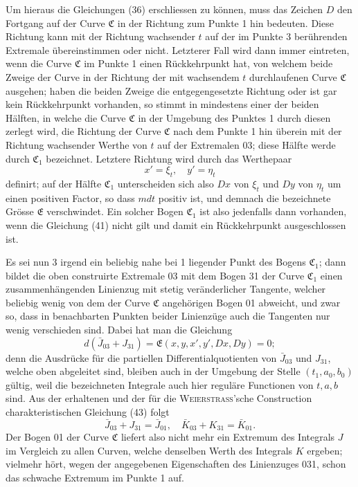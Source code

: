 \documentclass[11pt,a4paper,leqno]{article}
\begin{document}
Um hieraus die Gleichungen (36) erschliessen zu können, muss das Zeichen $D$ den Fortgang auf der Curve $\mathfrak{C}$ in der Richtung zum Punkte 1 hin bedeuten. Diese Richtung kann mit der Richtung wachsender $t$ auf der im Punkte 3 berührenden Extremale übereinstimmen oder nicht. Letzterer Fall wird dann immer eintreten, wenn die Curve $\mathfrak{C}$ im Punkte 1 einen Rückkehrpunkt hat, von welchem beide Zweige der Curve in der Richtung der mit wachsendem $t$ durchlaufenen Curve $\mathfrak{C}$ ausgehen; haben die beiden Zweige die entgegengesetzte Richtung oder ist gar kein Rückkehrpunkt vorhanden, so stimmt in mindestens einer der beiden Hälften, in welche die Curve $\mathfrak{C}$ in der Umgebung des Punktes 1 durch diesen zerlegt wird, die Richtung der Curve $\mathfrak{C}$ nach dem Punkte 1 hin überein mit der Richtung wachsender Werthe von $t$ auf der Extremalen 03; diese Hälfte werde durch $\mathfrak{C}_1$ bezeichnet. Letztere Richtung wird durch das Werthepaar
\[
x'=\xi_t,
\quad y'=\eta_t
\]
definirt; auf der Hälfte $\mathfrak{C}_1$ unterscheiden sich also $Dx$ von $\xi_t$ und $Dy$ von $\eta_t$ um einen positiven Factor, so dass $mdt$ positiv ist, und demnach die bezeichnete Grösse $\mathfrak{E}$ verschwindet. Ein solcher Bogen $\mathfrak{C}_1$ ist also jedenfalls dann vorhanden, wenn die Gleichung (41) nicht gilt und damit ein Rückkehrpunkt ausgeschlossen ist.

Es sei nun 3 irgend ein beliebig nahe bei 1 liegender Punkt des Bogens $\mathfrak{C}_1$; dann bildet die oben construirte Extremale 03
mit dem Bogen 31 der Curve $\mathfrak{C}_1$ einen zusammenhängenden Linienzug mit stetig veränderlicher Tangente, welcher beliebig wenig von dem der Curve $\mathfrak{C}$ angehörigen Bogen 01 abweicht, und zwar so, dass in benachbarten Punkten beider Linienzüge auch die Tangenten nur wenig verschieden sind. Dabei hat man die Gleichung
\[
d(\bar J_{03}+J_{31})=\mathfrak{E}(x,y,x',y',Dx,Dy)=0;
\]
denn die Ausdrücke für die partiellen Differentialquotienten von $\bar J_{03}$ und $J_{31}$, welche oben abgeleitet sind, bleiben auch in der Umgebung der Stelle $(t_1,a_0,b_0)$ gültig, weil die bezeichneten Integrale auch hier reguläre Functionen von $t,a,b$ sind. Aus der erhaltenen und der für die \textsc{Weierstrass}'sche Construction charakteristischen Gleichung (43) folgt
\[
\bar J_{03}+J_{31}=\bar J_{01},
\quad \bar K_{03}+K_{31}=\bar K_{01}.
\]
Der Bogen 01 der Curve $\mathfrak{C}$ liefert also nicht mehr ein Extremum des Integrals $J$ im Vergleich zu allen Curven, welche denselben Werth des Integrals $K$ ergeben; vielmehr hört, wegen der angegebenen Eigenschaften des Linienzuges 031, schon das schwache Extremum im Punkte 1 auf.
\end{document}
